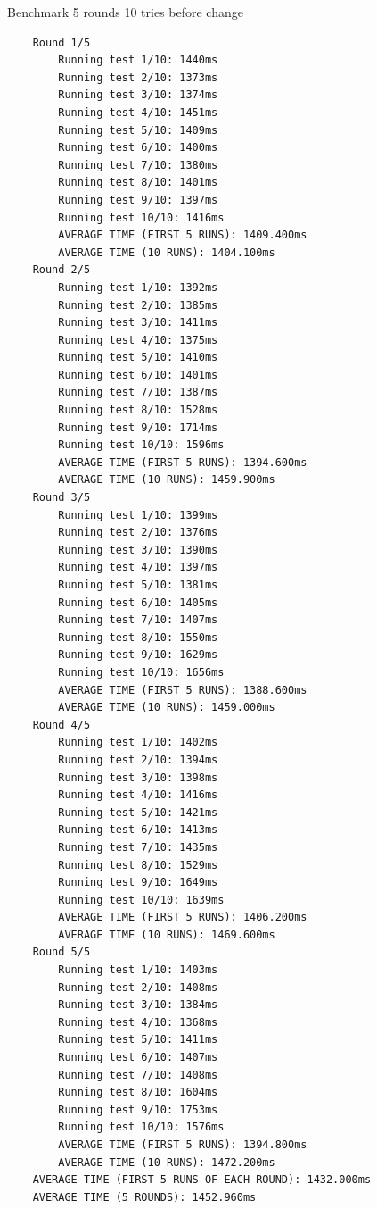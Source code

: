 Benchmark 5 rounds 10 tries before change
\footnotesize\begin{verbatim}
    Round 1/5
        Running test 1/10: 1440ms
        Running test 2/10: 1373ms
        Running test 3/10: 1374ms
        Running test 4/10: 1451ms
        Running test 5/10: 1409ms
        Running test 6/10: 1400ms
        Running test 7/10: 1380ms
        Running test 8/10: 1401ms
        Running test 9/10: 1397ms
        Running test 10/10: 1416ms
        AVERAGE TIME (FIRST 5 RUNS): 1409.400ms
        AVERAGE TIME (10 RUNS): 1404.100ms
    Round 2/5
        Running test 1/10: 1392ms
        Running test 2/10: 1385ms
        Running test 3/10: 1411ms
        Running test 4/10: 1375ms
        Running test 5/10: 1410ms
        Running test 6/10: 1401ms
        Running test 7/10: 1387ms
        Running test 8/10: 1528ms
        Running test 9/10: 1714ms
        Running test 10/10: 1596ms
        AVERAGE TIME (FIRST 5 RUNS): 1394.600ms
        AVERAGE TIME (10 RUNS): 1459.900ms
    Round 3/5
        Running test 1/10: 1399ms
        Running test 2/10: 1376ms
        Running test 3/10: 1390ms
        Running test 4/10: 1397ms
        Running test 5/10: 1381ms
        Running test 6/10: 1405ms
        Running test 7/10: 1407ms
        Running test 8/10: 1550ms
        Running test 9/10: 1629ms
        Running test 10/10: 1656ms
        AVERAGE TIME (FIRST 5 RUNS): 1388.600ms
        AVERAGE TIME (10 RUNS): 1459.000ms
    Round 4/5
        Running test 1/10: 1402ms
        Running test 2/10: 1394ms
        Running test 3/10: 1398ms
        Running test 4/10: 1416ms
        Running test 5/10: 1421ms
        Running test 6/10: 1413ms
        Running test 7/10: 1435ms
        Running test 8/10: 1529ms
        Running test 9/10: 1649ms
        Running test 10/10: 1639ms
        AVERAGE TIME (FIRST 5 RUNS): 1406.200ms
        AVERAGE TIME (10 RUNS): 1469.600ms
    Round 5/5
        Running test 1/10: 1403ms
        Running test 2/10: 1408ms
        Running test 3/10: 1384ms
        Running test 4/10: 1368ms
        Running test 5/10: 1411ms
        Running test 6/10: 1407ms
        Running test 7/10: 1408ms
        Running test 8/10: 1604ms
        Running test 9/10: 1753ms
        Running test 10/10: 1576ms
        AVERAGE TIME (FIRST 5 RUNS): 1394.800ms
        AVERAGE TIME (10 RUNS): 1472.200ms
    AVERAGE TIME (FIRST 5 RUNS OF EACH ROUND): 1432.000ms
    AVERAGE TIME (5 ROUNDS): 1452.960ms
\end{verbatim}
\normalsize

